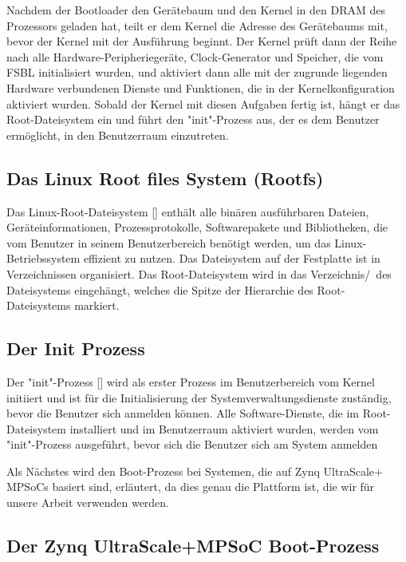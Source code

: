 Nachdem der Bootloader den Gerätebaum und den Kernel in den DRAM des Prozessors geladen hat, teilt er dem Kernel die Adresse des Gerätebaums mit, bevor der Kernel mit der Ausführung beginnt. Der Kernel prüft dann der Reihe nach alle Hardware-Peripheriegeräte, Clock-Generator und Speicher, die vom FSBL initialisiert wurden, und aktiviert dann alle mit der zugrunde liegenden Hardware verbundenen Dienste und Funktionen, die in der Kernelkonfiguration aktiviert wurden. Sobald der Kernel mit diesen Aufgaben fertig ist, hängt er das Root-Dateisystem ein und führt den "init"-Prozess aus, der es dem Benutzer ermöglicht, in den Benutzerraum einzutreten.

\subsection{Das Linux Root files System (Rootfs)}

Das Linux-Root-Dateisystem [\cite{Dervis2013}] enthält alle binären ausführbaren Dateien, Geräteinformationen, Prozessprotokolle, Softwarepakete und Bibliotheken, die vom Benutzer in seinem Benutzerbereich benötigt werden, um das Linux-Betriebssystem effizient zu nutzen. Das Dateisystem auf der Festplatte ist in Verzeichnissen organisiert. Das Root-Dateisystem wird in das Verzeichnis\grqq /\grqq\ des Dateisystems eingehängt, welches die Spitze der Hierarchie des Root-Dateisystems markiert.

\subsection{Der Init Prozess}

Der "init"-Prozess [\cite{Dervis2013}] wird als erster Prozess im Benutzerbereich vom Kernel initiiert und ist für die Initialisierung der Systemverwaltungsdienste zuständig, bevor die Benutzer sich anmelden können. Alle Software-Dienste, die im Root-Dateisystem installiert und im Benutzerraum aktiviert wurden, werden vom "init"-Prozess ausgeführt, bevor sich die Benutzer sich am System anmelden

Als Nächstes wird den Boot-Prozess bei Systemen, die auf Zynq UltraScale+ MPSoCs basiert sind, erläutert, da dies genau die Plattform ist, die wir für unsere Arbeit verwenden werden.

\subsection{Der Zynq UltraScale+MPSoC Boot-Prozess}

